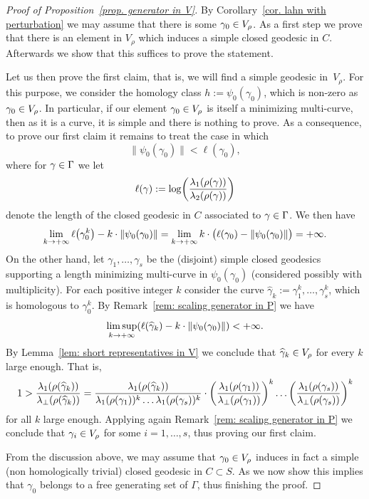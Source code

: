 \documentclass[AHL,Unicode,longabstracts]{cedram}
\renewcommand*{\to}{\mathchoice{\longrightarrow}{\rightarrow}{\rightarrow}{\rightarrow}}
\let\originalleft\left
\let\originalright\right
\renewcommand{\left}{\mathopen{}\mathclose\bgroup\originalleft}
\renewcommand{\right}{\aftergroup\egroup\originalright}
\let\oldin\in
\renewcommand{\in}{\mathchoice{\oldin}{\oldin}{\,\oldin\,}{\,\oldin\,}}
\begin{document}
\begin{proof}[Proof of Proposition~\ref{prop. generator in V}]
By Corollary~\ref{cor. lahn with perturbation} we may assume that there is some $\gamma_0\in V_\rho$. As a first step we prove that there is an element in $V_\rho$ which induces a simple closed geodesic in $C$. Afterwards we show that this suffices to prove the statement.


Let us then prove the first claim, that is, we will find a simple geodesic in~$V_\rho$. For this purpose, we consider the homology class $h:=\psi_0(\gamma_0)$, which is non-zero as $\gamma_0\in V_\rho$. In particular, if our element $\gamma_0\in V_\rho$ is itself a minimizing multi-curve, then as it is a curve, it is simple and there is nothing to prove.
As a consequence, to prove our first claim it remains to treat the case in which
\[
\|\psi_0(\gamma_0)\|<\ell(\gamma_0),
\]
where for $\gamma\in\Gamma$ we let
\[
\ell(\gamma):=\log\left(\frac{\lambda_1(\rho(\gamma))}{\lambda_2(\rho(\gamma))}\right)
\]
denote the length of the closed geodesic in $C$ associated to $\gamma\in\Gamma$.
We then have
\[
\lim_{k\to+\infty}\ell\bigl(\gamma_0^k\bigr)-k\cdot \| \psi_0(\gamma_0) \|=\lim_{k\to+\infty}k\cdot\bigl(\ell(\gamma_0)-\|\psi_0(\gamma_0)\|\bigr)=+\infty.
\]
On the other hand, let $\gamma_1,\dots,\gamma_s$ be the (disjoint) simple closed geodesics supporting a length minimizing multi-curve in $\psi_0(\gamma_0)$ (considered possibly with multiplicity). For each positive integer $k$ consider the curve $\widehat{\gamma}_k:=\gamma_1^k,\dots,\gamma_s^k$, which is homologous to $\gamma_0^k$.
By Remark~\ref{rem: scaling generator in P} we have
\[
\limsup_{k\to+\infty} \left(\ell(\widehat{\gamma}_k)-k\cdot \|\psi_0(\gamma_0)\|\right)<+\infty.
\]
By Lemma~\ref{lem: short representatives in V} we conclude that $\widehat{\gamma}_k\in V_\rho$ for every $k$ large enough.
That is,
\[
1>\frac{\lambda_1(\rho(\widehat{\gamma}_k))}{\lambda_\perp(\rho(\widehat{\gamma}_k))}=\frac{\lambda_1(\rho(\widehat{\gamma}_k))}{\lambda_1(\rho(\gamma_1))^k\dots\lambda_1(\rho(\gamma_s))^k}\cdot
\left(\frac{\lambda_1(\rho(\gamma_1))}{\lambda_\perp(\rho(\gamma_1))}\right)^k\dots \left(\frac{\lambda_1(\rho(\gamma_s))}{\lambda_\perp(\rho(\gamma_s))}\right)^k
\]
for all $k$ large enough.
Applying again Remark~\ref{rem: scaling generator in P} we conclude that $\gamma_i\in V_\rho$ for some $i=1,\dots,s$, thus proving our first claim.

From the discussion above, we may assume that $\gamma_0\in V_\rho$ induces in fact a simple (non homologically trivial) closed geodesic in $C\subset S$. As we now show this implies that $\gamma_0$ belongs to a free generating set of $\Gamma$, thus finishing the proof.



\end{proof}
\end{document}
